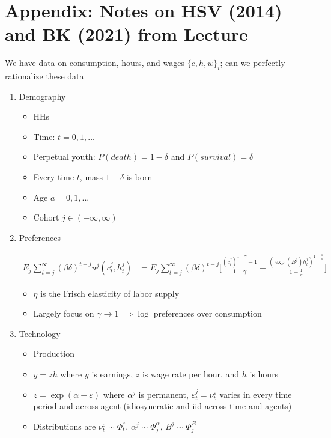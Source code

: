 \documentclass{article}
\begin{document}
\pagebreak

\section*{Appendix: Notes on HSV (2014) and BK (2021) from Lecture}

We have data on consumption, hours, and wages $\{c, h, w\}_i$; can we perfectly rationalize these data

\begin{enumerate}

\item Demography

\begin{itemize}
\item HHs
\item Time: $t=0,1,...$
\item Perpetual youth: $P(death) = 1 - \delta$ and $P(survival) = \delta$
\item Every time $t$, mass $1-\delta$ is born
\item Age $a = 0, 1,...$
\item Cohort $j \in (-\infty, \infty)$
\end{itemize}

\item Preferences

\begin{align*}
E_j \sum_{t=j}^\infty (\beta \delta)^{t-j} u^j(c_t^j, h_t^j) 
&= 
E_j \sum_{t=j}^\infty (\beta \delta)^{t-j} \Bigg[\frac{(c_t^j)^{1-\gamma}-1}{1-\gamma} - \frac{(\exp(B^j) h_t^j)^{1+\frac{1}{\eta}}}{1+\frac{1}{\eta}} \Bigg]
\end{align*}

\begin{itemize}
\item $\eta$ is the Frisch elasticity of labor supply
\item Largely focus on $\gamma \to 1 \implies \log$ preferences over consumption
\end{itemize}

\item Technology

\begin{itemize}
\item Production
\item $y = zh$ where $y$ is earnings, $z$ is wage rate per hour, and $h$ is hours
\item $z = \exp(\alpha + \varepsilon)$ where $\alpha^j$ is permanent, $\varepsilon_t^j = \nu_t^\varepsilon$ varies in every time period and across agent (idiosyncratic and iid across time and agents)
\item Distributions are $\nu_t^\varepsilon \sim \Phi_t^\varepsilon$, $\alpha^j \sim \Phi_j^\alpha$, $B^j \sim \Phi_j^B$ 
\end{itemize}


\end{enumerate}
\end{document}
